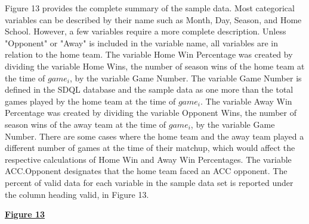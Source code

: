 \documentclass[preprint,12pt,times]{elsarticle}
\begin{document}
Figure 13 provides the complete summary of the sample data.  Most categorical variables can be described by their name such as Month, Day, Season, and Home School.  However, a few variables require a more complete description.  Unless "Opponent" or "Away" is included in the variable name, all variables are in relation to the home team.  The variable Home Win Percentage was created by dividing the variable Home Wins, the number of season wins of the home team at the time of $game_i$, by the variable Game Number.  The variable Game Number is defined in the SDQL database and the sample data as one more than the total games played by the home team at the time of $game_i$.  The variable Away Win Percentage was created by dividing the variable Opponent Wins, the number of season wins of the away team at the time of $game_i$, by the variable Game Number.  There are some cases where the home team and the away team played a different number of games at the time of their matchup, which would affect the respective calculations of Home Win and Away Win Percentages.  The variable ACC.Opponent designates that the home team faced an ACC opponent.  The percent of valid data for each  variable in the sample data set is reported under the column heading valid, in Figure 13.\\
\newpage
\begin{large}
\ul{\textbf{Figure 13}}
\end{large}\\
\end{document}
